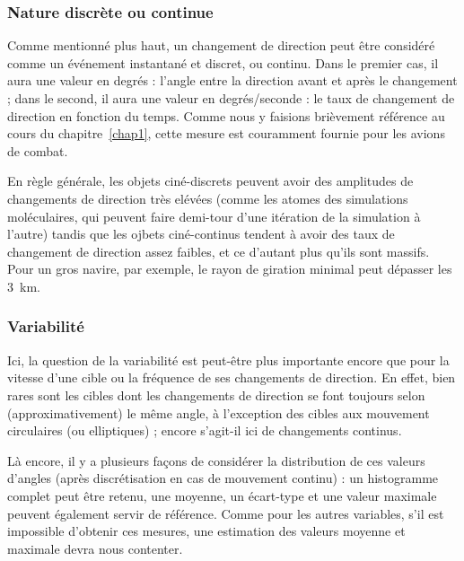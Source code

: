	\subsubsection{Nature discrète ou continue}
	Comme mentionné plus haut, un changement de direction peut être considéré comme un événement instantané et discret, ou continu. Dans le premier cas, il aura une valeur en degrés : l'angle entre la direction avant et après le changement ; dans le second, il aura une valeur en degrés/seconde : le taux de changement de direction en fonction du temps. Comme nous y faisions brièvement référence au cours du chapitre~\ref{chap1}, cette mesure est couramment fournie pour les avions de combat.
	
	En règle générale, les objets ciné-discrets peuvent avoir des amplitudes de changements de direction très elévées (comme les atomes des simulations moléculaires, qui peuvent faire demi-tour d'une itération de la simulation à l'autre) tandis que les ojbets ciné-continus tendent à avoir des taux de changement de direction assez faibles, et ce d'autant plus qu'ils sont massifs. Pour un gros navire, par exemple, le rayon de giration minimal peut dépasser les 3~km\footnotemark{}.
	
	
	\subsubsection{Variabilité}
	Ici, la question de la variabilité est peut-être plus importante encore que pour la vitesse d'une cible ou la fréquence de ses changements de direction. En effet, bien rares sont les cibles dont les changements de direction se font toujours selon (approximativement) le même angle, à l'exception des cibles aux mouvement circulaires (ou elliptiques) ; encore s'agit-il ici de changements continus.
	
	Là encore, il y a plusieurs façons de considérer la distribution de ces valeurs d'angles (après discrétisation en cas de mouvement continu) : un histogramme complet peut être retenu, une moyenne, un écart-type et une valeur maximale peuvent également servir de référence. Comme pour les autres variables, s'il est impossible d'obtenir ces mesures, une estimation des valeurs moyenne et maximale devra nous contenter.

